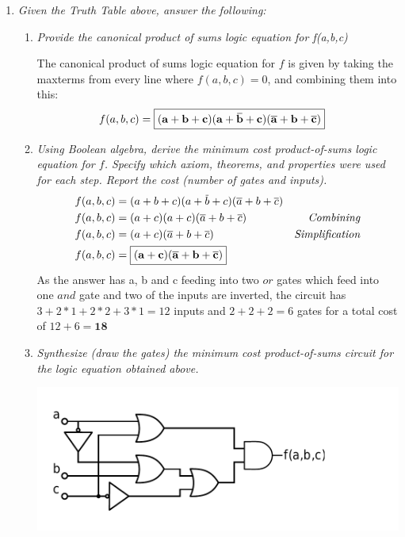 \documentclass[12pt]{article}
\newcommand{\overbar}[1]{\mkern 1.5mu\overline{\mkern-1.5mu#1\mkern-1.5mu}\mkern 1.5mu}
\begin{document}
\begin{enumerate}
    \item \textit{Given the Truth Table above, answer the following:} 
    
	\begin{enumerate}
		\item \textit{Provide the canonical product of sums logic equation for f(a,b,c)} 
        
		The canonical product of sums logic equation for $f$ is given by taking the maxterms from every line where $f(a,b,c)=0$, and combining them into this:
        \begin{align*}
        	f(a,b,c) &= \boxed{\mathbf{(a+b+c)(a+\overbar{b}+c)(\overline{a}+b+\overline{c})}}
        \end{align*}
		
        
		\item \textit{Using Boolean algebra, derive the minimum cost product-of-sums logic equation for $f$. Specify which axiom, theorems, and properties were used for each
step. Report the cost (number of gates and inputs).}
		\begin{align*}
        	f(a,b,c) &= (a+b+c)(a+\overbar{b}+c)(\overline{a}+b+\overline{c}) \\
        	f(a,b,c) &= (a+c)(a+c)(\overline{a}+b+\overline{c}) & \textit{Combining} \\
        	f(a,b,c) &= (a+c)(\overline{a}+b+\overline{c}) & \textit{Simplification} \\
            f(a,b,c) &= \boxed{\mathbf{(a+c)(\overline{a}+b+\overline{c})}}
        \end{align*}
        As the answer has a, b and c feeding into two $or$ gates which feed into one $and$ gate and two of the inputs are inverted, the circuit has $3+2*1+2*2+3*1=12$ inputs and $2+2+2=6$ gates for a total cost of $12+6=\boxed{\mathbf{18}}$ \\

		\newpage
		\item \textit{Synthesize (draw the gates) the minimum cost product-of-sums circuit for the logic
equation obtained above.}
		\begin{center}
			\includegraphics[scale=0.5]{circuit2.pdf}
		\end{center}
        
	\end{enumerate}

		
\end{enumerate}
\end{document}
